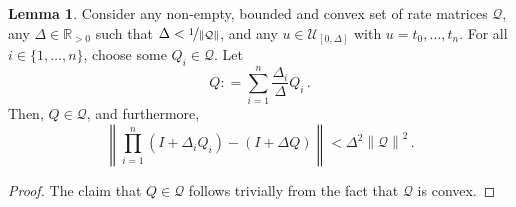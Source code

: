 \documentclass[10pt]{paper}
\theoremstyle{definition}
\newtheorem{lemma}[theorem]{Lemma}
\newcommand{\reals}{\mathbb{R}}
\newcommand{\realspos}{\reals_{>0}}
\newcommand{\rateset}{\mathcal{Q}}
\newcommand{\norm}[1]{\left\lVert #1 \right\rVert}
\newcommand{\coloneqq}{:\!=}
\begin{document}
\begin{lemma}\label{lemma:convex_rate_set_contains_approximation}
Consider any non-empty, bounded and convex set of rate matrices $\rateset$, any $\Delta\in\realspos$ such that $\Delta<\nicefrac{1}{\norm{\rateset}}$, and any $u\in\mathcal{U}_{[0,\Delta]}$ with $u=t_0,\ldots,t_n$. For all $i\in\{1,\ldots,n\}$, choose some $Q_i\in\rateset$. Let
\begin{equation*}
Q \coloneqq \sum_{i=1}^n \frac{\Delta_i}{\Delta}Q_i\,.
\end{equation*}
Then, $Q\in\rateset$, and furthermore,
\begin{equation*}
\norm{\prod_{i=1}^n(I+\Delta_iQ_i) - (I+\Delta Q)} < \Delta^2\norm{\rateset}^2\,.
\end{equation*}
\end{lemma}
\begin{proof}
The claim that $Q\in\rateset$ follows trivially from the fact that $\rateset$ is convex.


\end{proof}
\end{document}
